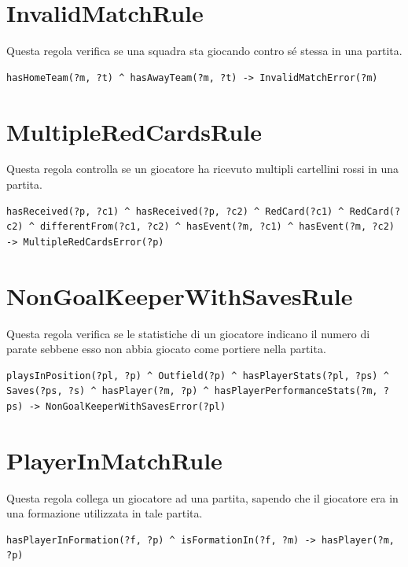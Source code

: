 \documentclass[11pt]{report} %
\begin{document}
\section{InvalidMatchRule}

Questa regola verifica se una squadra sta giocando contro sé stessa in una partita.

\begin{lstlisting}[language=SWRL]
hasHomeTeam(?m, ?t) ^ hasAwayTeam(?m, ?t) -> InvalidMatchError(?m)
\end{lstlisting}

\section{MultipleRedCardsRule}

Questa regola controlla se un giocatore ha ricevuto multipli cartellini rossi in una partita.

\begin{lstlisting}[language=SWRL]
hasReceived(?p, ?c1) ^ hasReceived(?p, ?c2) ^ RedCard(?c1) ^ RedCard(?c2) ^ differentFrom(?c1, ?c2) ^ hasEvent(?m, ?c1) ^ hasEvent(?m, ?c2) -> MultipleRedCardsError(?p)
\end{lstlisting}

\section{NonGoalKeeperWithSavesRule}

Questa regola verifica se le statistiche di un giocatore indicano il numero di parate sebbene esso non abbia giocato come portiere nella partita.

\begin{lstlisting}[language=SWRL]
playsInPosition(?pl, ?p) ^ Outfield(?p) ^ hasPlayerStats(?pl, ?ps) ^ Saves(?ps, ?s) ^ hasPlayer(?m, ?p) ^ hasPlayerPerformanceStats(?m, ?ps) -> NonGoalKeeperWithSavesError(?pl)
\end{lstlisting}

\section{PlayerInMatchRule}

Questa regola collega un giocatore ad una partita, sapendo che il giocatore era in una formazione utilizzata in tale partita.

\begin{lstlisting}[language=SWRL]
hasPlayerInFormation(?f, ?p) ^ isFormationIn(?f, ?m) -> hasPlayer(?m, ?p)
\end{lstlisting}
\end{document}
